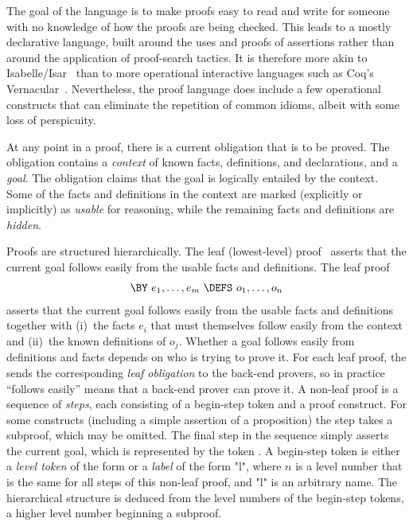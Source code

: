 \documentclass[a4paper]{easychair}
\begin{document}
The goal of the language is to make proofs easy to read and write for
someone with no knowledge of how the proofs are being checked.  This
leads to a mostly declarative language, built around the uses and
proofs of assertions rather than around the application of
proof-search tactics.  It is therefore more akin to
Isabelle/Isar~\cite{isar} than to more operational interactive
languages such as Coq's Vernacular~\cite{coq}.
Nevertheless, the proof language does include a few operational
constructs that can eliminate the repetition of common idioms, albeit
with some loss of perspicuity.


At any point in a \tlaplus proof, there is a current obligation that
is to be proved.  The obligation contains a \emph{context} of known
facts, definitions, and declarations, and a \emph{goal}.
The obligation claims that the goal is logically entailed by the
context.  Some of the facts and definitions in the context are marked
(explicitly or implicitly) as \emph{usable} for reasoning, while the
remaining facts and definitions are \textit{hidden}.

Proofs are structured hierarchically. The leaf (lowest-level) proof
\OBVIOUS\ asserts that the current goal follows easily from the usable
facts and definitions.  The leaf proof
\begin{gather*}
  \BY\ e_{1},\ldots, e_{m} \ \DEFS\ o_{1},\ldots, o_{n}
\end{gather*}
asserts that the current goal follows easily from the usable facts and
definitions together with (i)~the facts $e_{i}$ that must themselves
follow easily from the context and (ii)~the known definitions of
$o_{j}$.  Whether a goal follows easily from definitions and facts
depends on who is trying to prove it.  For each leaf proof,
the \PM sends the corresponding \emph{leaf obligation} 
to the back-end provers, so in practice ``follows easily''
means that a back-end prover can prove it.
A non-leaf proof is a sequence of \textit{steps}, each consisting of a
begin-step token and a proof construct.  For some constructs
(including a simple assertion of a proposition) the step takes a
subproof, which may be omitted.  The final step in the sequence simply
asserts the current goal, which is represented by the token \QED.
A begin-step token is either a \emph{level token} of the form  or
a \emph{label} of the form "l", where $n$ is a level number that
is the same for all steps of this non-leaf proof, and "l" is an
arbitrary name.  The hierarchical structure is deduced from the level
numbers of the begin-step tokens, a higher level number beginning a
subproof.
\end{document}
